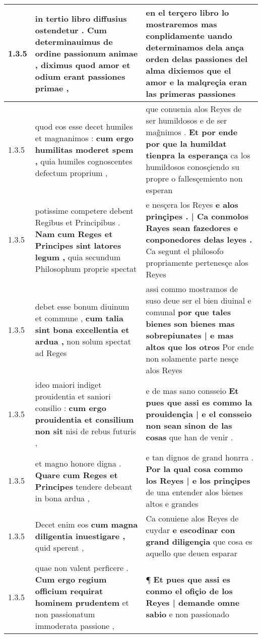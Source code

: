 \begin{tabular}{|p{1cm}|p{6.5cm}|p{6.5cm}|}
1.3.5 & in tertio libro diffusius ostendetur . \textbf{ Cum determinauimus de ordine passionum animae , } diximus quod amor et odium erant passiones primae , & en el terçero libro lo mostraremos mas conplidamente \textbf{ uando determinamos dela ança orden delas passiones del alma dixiemos } que el amor e la malqreçia eran las primeras passiones \\\hline
1.3.5 & quod eos esse decet humiles et magnanimos : \textbf{ cum ergo humilitas moderet spem , } quia humiles cognoscentes defectum proprium , & que conuenia alos Reyes de ser humildosos e de ser mag̃nimos . \textbf{ Et por ende por que la humildat tienpra la esperança } ca los humildosos conosçiendo su propre o fallesçemiento non esperan \\\hline
1.3.5 & potissime competere debent Regibus et Principibus . \textbf{ Nam cum Reges et Principes sint latores legum , } quia secundum Philosophum proprie spectat & e nesçera los Reyes \textbf{ e alos prinçipes . | Ca conmolos Rayes sean fazedores e conponedores delas leyes . } Ca segunt el philosofo propriamente pertenesçe alos Reyes \\\hline
1.3.5 & debet esse bonum diuinum et commune , \textbf{ cum talia sint bona excellentia et ardua , } non solum spectat ad Reges & assi commo mostramos de suso deue ser el bien diuinal e comunal \textbf{ por que tales bienes son bienes mas sobrepiunates | e mas altos que los otros } Por ende non solamente parte nesçe alos Reyes \\\hline
1.3.5 & ideo maiori indiget prouidentia et saniori consilio : \textbf{ cum ergo prouidentia et consilium non sit } nisi de rebus futuris , & e de mas sano consseio \textbf{ Et pues que assi es commo la prouidençia | e el consseio non sean sinon de las cosas } que han de venir . \\\hline
1.3.5 & et magno honore digna . \textbf{ Quare cum Reges et Principes } tendere debeant in bona ardua , & e tan dignos de grand honrra . \textbf{ Por la qual cosa commo los Reyes | e los prinçipes } de una entender alos bienes altos e grandes \\\hline
1.3.5 & Decet enim eos \textbf{ cum magna diligentia inuestigare , } quid sperent , & Ca conuiene alos Reyes de cuydar \textbf{ e escodinar con grand diligençia } que cosa es aquello que deuen esparar \\\hline
1.3.5 & quae non valent perficere . \textbf{ Cum ergo regium officium requirat hominem prudentem } et non passionatum immoderata passione , & ¶ \textbf{ Et pues que assi es conmo el ofiçio de los Reyes | demande omne sabio } e non passionado \\\hline

\end{tabular}
